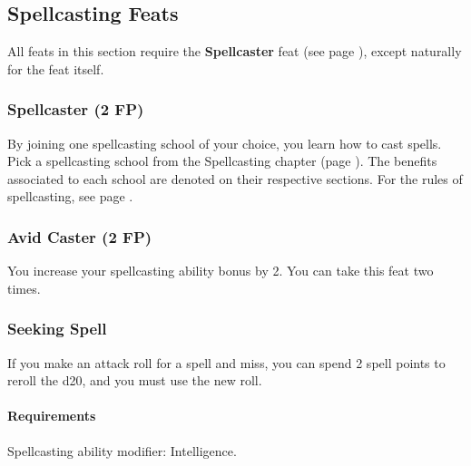 \subsection*{Spellcasting Feats}
All feats in this section require the \textbf{Spellcaster} feat (see page \pageref{feat::spellcaster}), except naturally for the feat itself.


\subsubsection{Spellcaster (2 FP)} \label{feat::spellcaster}
    By joining one spellcasting school of your choice, you learn how to cast spells.
    Pick a spellcasting school from the Spellcasting chapter (page \pageref{ch::spellcasting}).
    The benefits associated to each school are denoted on their respective sections.
    For the rules of spellcasting, see page \pageref{sec::spellcastingrules}.
\subsubsection{Avid Caster (2 FP)} \label{feat::avidcaster}
    You increase your spellcasting ability bonus by 2.
    You can take this feat two times.

\subsubsection{Seeking Spell} \label{feat::seekingspell}
    If you make an attack roll for a spell and miss, you can spend 2 spell points to reroll the d20, and you must use the new roll.
    \paragraph{Requirements} Spellcasting ability modifier: Intelligence.
